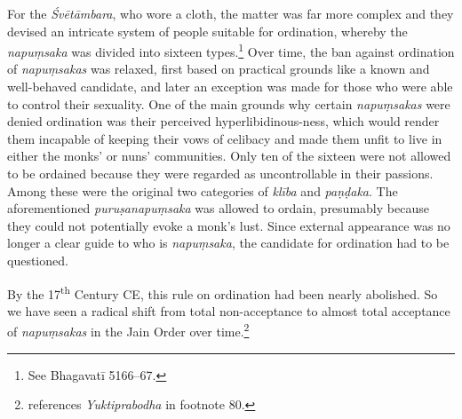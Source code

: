 For the {\em Śvētāmbara}, who wore a cloth, the matter was far more complex and they devised an intricate system of people suitable for ordination, whereby the {\em napuṃsaka} was divided into sixteen types.\footnote{See Bhagavatī 5166–67.} Over time, the ban against ordination of {\em napuṃsakas} was relaxed, first based on practical grounds like a known and well-behaved candidate, and later an exception was made for those who were able to control their sexuality. One of the main grounds why certain {\em napuṃsakas} were denied ordination was their perceived hyperlibidinous-ness, which would render them incapable of keeping their vows of celibacy and made them unfit to live in either the monks' or nuns' communities. Only ten of the sixteen were not allowed to be ordained because they were regarded as uncontrollable in their passions. Among these were the original two categories of {\em klība} and {\em paṇḍaka}. The aforementioned {\em puruṣanapuṃsaka} was allowed to ordain, presumably because they could not potentially evoke a monk's lust. Since external appearance was no longer a clear guide to who is {\em napuṃsaka}, the candidate for ordination had to be questioned. 

By the 17\textsuperscript{th} Century CE, this rule on ordination had been nearly abolished. So we have seen a radical shift from total non-acceptance to almost total acceptance of {\em napuṃsakas} in the Jain Order over time.\footnote{\cite{zwilling} references {\em Yuktiprabodha} in footnote 80.}

